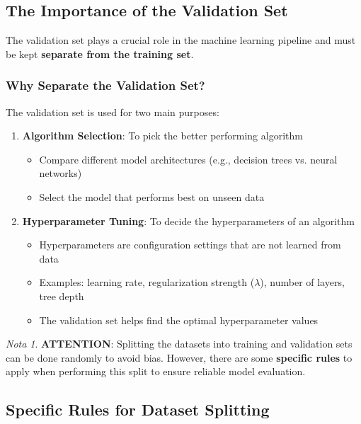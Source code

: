 \documentclass[11pt,a4paper]{article}
\theoremstyle{definition}
\theoremstyle{plain}
\theoremstyle{remark}
\newtheorem*{remark}{Nota}
\begin{document}
\subsection{The Importance of the Validation Set}

The validation set plays a crucial role in the machine learning pipeline and must be kept \textbf{separate from the training set}.

\subsubsection{Why Separate the Validation Set?}

The validation set is used for two main purposes:

\begin{enumerate}
    \item \textbf{Algorithm Selection}: To pick the better performing algorithm
    \begin{itemize}
        \item Compare different model architectures (e.g., decision trees vs. neural networks)
        \item Select the model that performs best on unseen data
    \end{itemize}
    
    \item \textbf{Hyperparameter Tuning}: To decide the hyperparameters of an algorithm
    \begin{itemize}
        \item Hyperparameters are configuration settings that are not learned from data
        \item Examples: learning rate, regularization strength ($\lambda$), number of layers, tree depth
        \item The validation set helps find the optimal hyperparameter values
    \end{itemize}
\end{enumerate}

\begin{remark}
\textbf{ATTENTION}: Splitting the datasets into training and validation sets can be done randomly to avoid bias. However, there are some \textbf{specific rules} to apply when performing this split to ensure reliable model evaluation.
\end{remark}

\subsection{Specific Rules for Dataset Splitting}
\end{document}
